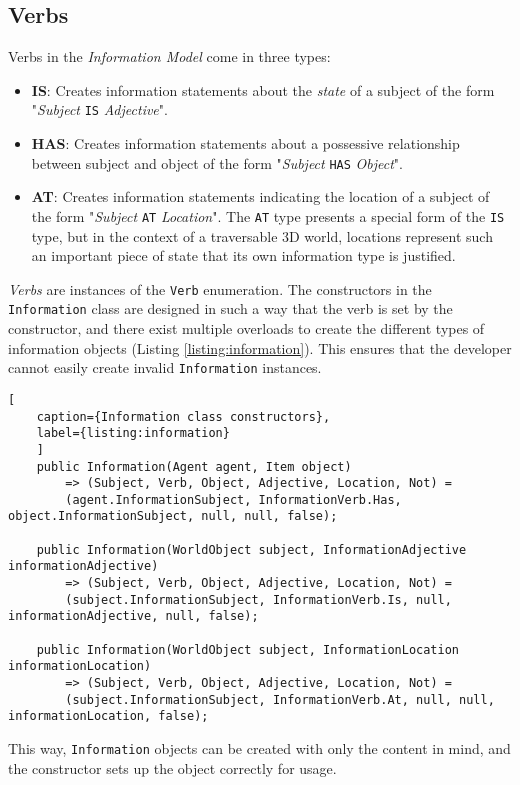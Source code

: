 \subsection{Verbs}
Verbs in the \textit{Information Model} come in three types:
\begin{itemize}
	\item \textbf{IS}: Creates information statements about the \textit{state} of a subject of the form "\textit{Subject} \verb|IS| \textit{Adjective}".
	\item \textbf{HAS}: Creates information statements about a possessive relationship between subject and object of the form "\textit{Subject} \verb|HAS| \textit{Object}".
	\item \textbf{AT}: Creates information statements indicating the location of a subject of the form "\textit{Subject} \verb|AT| \textit{Location}". The \verb|AT| type presents a special form of the \verb|IS| type, but in the context of a traversable 3D world, locations represent such an important piece of state that its own information type is justified.
\end{itemize}
\textit{Verbs} are instances of the \verb|Verb| enumeration. The constructors in the \verb|Information| class are designed in such a way that the verb is set by the constructor, and there exist multiple overloads to create the different types of information objects (Listing \ref{listing:information}). This ensures that the developer cannot easily create invalid \verb|Information| instances.
\begin{lstlisting}[
	caption={Information class constructors},
	label={listing:information}
	]
	public Information(Agent agent, Item object)
		=> (Subject, Verb, Object, Adjective, Location, Not) =
		(agent.InformationSubject, InformationVerb.Has, object.InformationSubject, null, null, false);
	
	public Information(WorldObject subject, InformationAdjective informationAdjective)
		=> (Subject, Verb, Object, Adjective, Location, Not) =
		(subject.InformationSubject, InformationVerb.Is, null, informationAdjective, null, false);
	
	public Information(WorldObject subject, InformationLocation informationLocation)
		=> (Subject, Verb, Object, Adjective, Location, Not) =
		(subject.InformationSubject, InformationVerb.At, null, null, informationLocation, false);
\end{lstlisting}
This way, \verb|Information| objects can be created with only the content in mind, and the constructor sets up the object correctly for usage.
